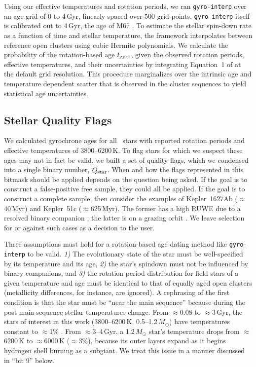 \documentclass[11pt,twocolumn,tighten]{aastex63}
\begin{document}
Using our effective temperatures and rotation periods, we ran
\texttt{gyro-interp} over an age grid of 0 to 4\,Gyr, linearly spaced
over 500 grid points.  \texttt{gyro-interp} itself is calibrated out
to 4\,Gyr, the age of M67
\citep[see][]{Dungee_2022,Gruner_2023}.  To estimate the
stellar spin-down rate as a function of time and stellar temperature,
the framework interpolates between reference open clusters using cubic
Hermite polynomials.  We calculate the probability of the
rotation-based age $t_{\rm gyro}$, given the observed rotation
periods, effective temperatures, and their uncertainties by
integrating Equation~1 of \citet{Bouma_2023} at the default grid
resolution.  This procedure marginalizes over the intrinsic age and
temperature dependent scatter that is observed in the cluster
sequences to yield statistical age uncertainties.


\subsection{Stellar Quality Flags}
\label{subsec:flags}
We calculated gyrochrone ages for all \nuniqstarsantosrotteffcut\
stars with reported rotation periods and effective temperatures of
3800--6200\,K.  To flag stars for which we suspect these ages may not
in fact be valid, we built a set of quality flags, which we condensed
into a single binary number, $Q_{\rm star}$.  When and how the flags
represented in this bitmask should be applied depends on the question being
asked.  If the goal is to construct a false-positive free sample, they
could all be applied.  If the goal is to construct a complete sample,
then consider the examples of Kepler~1627Ab ($\approx$40\,Myr) and
Kepler~51c ($\approx$625\,Myr).  The former has a high RUWE due to a
resolved binary companion \citep{Bouma_2022a}; the latter is on a
grazing orbit \citep{2014ApJ...783...53M}.  We leave selection for or
against such cases as a decision to the user.

Three assumptions must hold for a rotation-based age dating method
like \texttt{gyro-interp} to be valid.  {\it 1)} The evolutionary
state of the star must be well-specified by its temperature and its
age, {\it 2)} the star's spindown must not be influenced by binary
companions, and {\it 3)} the rotation period distribution for field
stars of a given temperature and age must be identical to that of
equally aged open clusters (metallicity differences, for instance, are
ignored).  A rephrasing of the first condition is that the star must
be ``near the main sequence'' because during the post main sequence
stellar temperatures change.  From $\approx$0.08 to $\approx$3\,Gyr,
the stars of interest in this work (3800--6200\,K,
0.5--1.2\,$M_\odot$) have temperatures constant to $\approx$1\%
\citep{Choi_2016}.  From $\approx$3--4\,Gyr, a 1.2\,$M_\odot$ star's
temperature drops from $\approx$6200\,K to $\approx$6000\,K
($\approx$3\%), because its outer layers expand as it begins hydrogen
shell burning as a subgiant.  We treat this issue in a manner
discussed in ``bit 9'' below.
\end{document}
